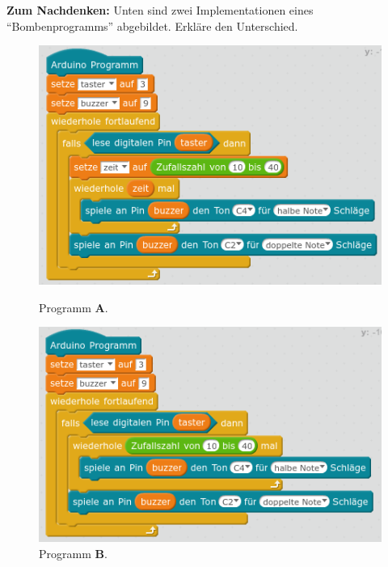 \documentclass[ngerman, 11pt]{scrreprt}
\begin{document}
	\setcounter{chapter}{4}
	\setcounter{section}{3}
	
	\begin{ziel}
		\textbf{Zum Nachdenken:} Unten sind zwei Implementationen eines \enquote{Bombenprogramms} abgebildet. Erkläre den Unterschied.
	\end{ziel}
	
	\bigskip
	\begin{figure}[H]
		\begin{minipage}{0.49\textwidth}
			\centering
			\includegraphics[width=\textwidth]{../lsg/4-3-Bombe-Lsg1.png}
			\caption{Programm \textbf{A}.}
		\end{minipage}
		\hfill
		\begin{minipage}{0.49\textwidth}
			\centering
			\includegraphics[width=\textwidth]{../lsg/4-3-Bombe-Lsg2.png}
			\caption{Programm \textbf{B}.}
		\end{minipage}
	\end{figure}
	
\end{document}
